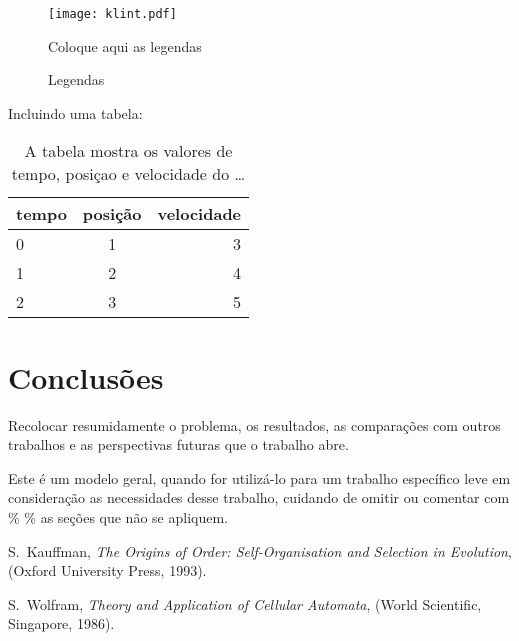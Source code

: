 \begin{figure}[hbtp]
\begin{center}
\texttt{[image: klint.pdf]}
\caption{Coloque aqui as legendas}
\label{fig}
\end{center}
\end{figure}
\vspace{0.5cm}

\begin{figure}[htbp]
\begin{center}
\caption{Legendas}
\label{fig_rotacao}
\end{center}
\end{figure}



Incluindo uma tabela:
\begin{table}[h]
\begin{tabular}{||l|c|r||} \hline
tempo& posição & velocidade\\
\hline
0 & 1 & 3\\
 1 & 2 & 4\\
 2 & 3 & 5\\
 \hline
 \end{tabular}
 \caption{A tabela mostra os valores de tempo, posiçao e velocidade do
{\ldots} }
\end{table}

\section{Conclusões}
Recolocar resumidamente o problema, os resultados, as comparações \cite{Wolfram_book} com outros
trabalhos e as perspectivas futuras que o trabalho abre.

{\color{red} Este é um modelo geral, quando for utilizá-lo para um trabalho
específico leve em consideração as necessidades desse trabalho,
cuidando de omitir ou comentar com \% \% as seções que não
se apliquem.}

\begin{thebibliography}{99}

S.~Kauffman, {\em The Origins of Order: Self-Organisation and
Selection in Evolution}, (Oxford University Press, 1993).

S.~Wolfram, {\em Theory and Application of Cellular Automata},
(World Scientific, Singapore, 1986).

\end{thebibliography}



